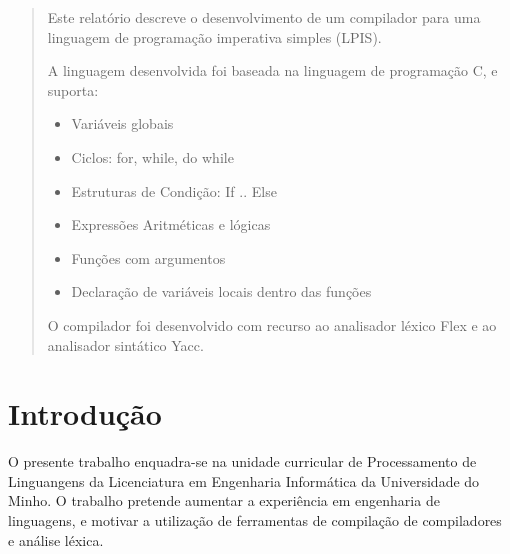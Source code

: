 \documentclass[a4paper,10pt]{report}
\begin{document}


\begin{abstract}
Este relatório descreve o desenvolvimento de um compilador para uma linguagem de programação imperativa simples (LPIS). 

A linguagem desenvolvida foi baseada na linguagem de programação C, e suporta:
\begin{itemize}
  \item Variáveis globais
  \item Ciclos: for, while, do while
  \item Estruturas de Condição: If .. Else
  \item Expressões Aritméticas e lógicas
  \item Funções com argumentos
  \item Declaração de variáveis locais dentro das funções
\end{itemize}
O compilador foi desenvolvido com recurso ao analisador léxico Flex e ao analisador sintático Yacc.

\end{abstract}
\tableofcontents
\thispagestyle{empty} %

\chapter{Introdução}
\label{cap:intro}
O presente trabalho enquadra-se na unidade curricular de Processamento de Linguangens da Licenciatura em Engenharia Informática da Universidade do Minho. O trabalho pretende aumentar a experiência em engenharia de linguagens, e motivar a utilização de ferramentas de compilação de compiladores e análise léxica.
\end{document}

